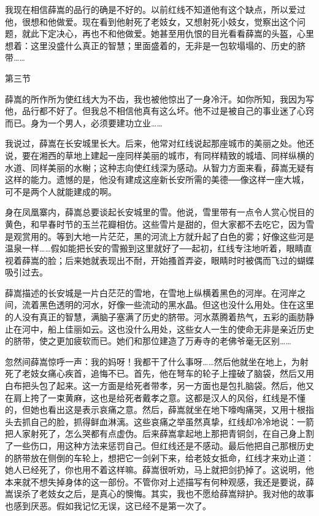 我现在相信薛嵩的品行的确是不好的。以前红线不知道他有这个缺点，所以爱过他，很想和他做爱。现在看到他射死了老妓女，又想射死小妓女，觉察出这个问题，就此下定决心，再也不和他做爱。她甚至用仇恨的目光看看薛嵩的头盔，心里想着：这里没盛什么真正的智慧；里面盛着的，无非是一包软塌塌的、历史的脐带…… 

第三节 

薛嵩的所作所为使红线大为不齿，我也被他惊出了一身冷汗。如你所知，我因为写他，品行都不好了。但我总不相信他真有这么坏。他不过是被自己的事业迷了心窍而已。身为一个男人，必须要建功立业…… 

我说过，薛嵩在长安城里长大。后来，他常对红线说起那座城市的美丽之处。他还说，要在湘西的草地上建起一座同样美丽的城市，有同样精致的城墙、同样纵横的水道、同样美丽的水榭；这种志向使红线深为感动。从智力方面来看，薛嵩无疑有这样的能力。遗憾的是，他没有建成这座新长安所需的美德──像这样一座大城，可不是两个人就能建成的啊。 

身在凤凰寨内，薛嵩总要谈起长安城里的雪。他说，雪里带有一点令人赏心悦目的黄色，和早春时节的玉兰花瓣相仿。这些雪片是甜的，但大家都不去吃它，因为雪是观赏用的。等到大地一片茫茫，黑的河流上方就升起了白色的雾；好像这些河是温泉一样……假如能把长安的雪搬到这里就好了──起初，红线专注地听着，眼睛直视着薛嵩的脸；后来她就表现出不耐，开始搔首弄姿，眼睛时时被偶而飞过的蝴蝶吸引过去。 

薛嵩描述的长安城是一片白茫茫的雪地，在雪地上纵横着黑色的河岸。在河岸之间，流着黑色透明的河水，好像一些流动的黑水晶。但这也没什么用处。住在这里的人没有真正的智慧，满脑子塞满了历史的脐带。河水蒸腾着热气，五彩的画肪静止在河中，船上佳丽如云。这也没什么用处，这些女人一生的使命无非是亲近历史的脐带，使之更加疲软而已。她们和那位建造了万寿寺的老佛爷毫无区别…… 

忽然间薛嵩惊呼一声：我的妈呀！我都干了什么事呀……然后他就坐在地上，为射死了老妓女痛心疾首，追悔不已。首先，他在弩车的轮子上撞破了脑袋，然后又用白布把头包了起来。这一方面是给死者带孝，另一方面也是包扎脑袋。然后，他又在肩上挎了一束黄麻，这也是给死者戴孝之意。这都是汉人的风俗，红线是不懂的，但她也看出这是表示哀痛之意。然后，薛嵩就坐在地下嚎啕痛哭，又用十根指头去抓自己的脸，抓得鲜血淋漓。这些哀痛之举虽然真挚，红线却冷冷地说：一箭把人家射死了，怎么哭都有点虚伪。后来薛嵩拿起地上那把青铜剑，在自己身上割了一些伤口，用这种方法来惩罚自己。但红线还是不感动。最后他把自己那根历史的脐带放在侧倒的车轮上，想把它一剑剁下来，给老妓女抵命，红线才来劝止道：她人已经死了，你也用不着这样嘛。薛嵩很听劝，马上就把剑扔掉了。这说明，他本来就不想失掉身体的这一部份。不管你对上述描写有何种观感，我还是要说，薛嵩误杀了老妓女之后，是真心的懊悔。其实，我也不愿给薛嵩辩护。我对他的故事也感到厌恶。假如我记忆无误，这已经不是第一次了。 


